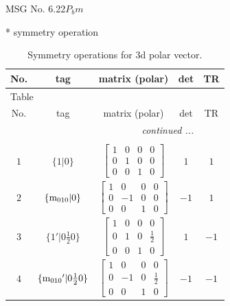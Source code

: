 \documentclass[fleqn,8pt]{jsarticle}
\begin{document}
\setcounter{MaxMatrixCols}{32}

\renewcommand{\tablename}{Table~}
\renewcommand{\figurename}{Figure~}
\begin{center}
\LARGE
MSG No. 6.22\quad$P_{b}m$
\end{center}
* symmetry operation
\renewcommand{\arraystretch}{1.3}
\begin{longtable}{ccccc}
\caption{Symmetry operations for 3d polar vector.}
 \\
 \hline \hline
No. & tag & matrix (polar) & det & TR \\ \hline \endfirsthead

\multicolumn{4}{l}{\tablename\ \thetable{}} \\
 \hline \hline
No. & tag & matrix (polar) & det & TR \\ \hline \endhead

 \hline \hline
\multicolumn{4}{r}{\footnotesize\it continued ...} \\ \endfoot

 \hline \hline
\multicolumn{4}{r}{} \\ \endlastfoot

$ 1 $ & $ \{1|0\} $ & $ \begin{bmatrix} 1 & 0 & 0 & 0 \\ 0 & 1 & 0 & 0 \\ 0 & 0 & 1 & 0 \end{bmatrix} $ & $ 1 $ & $ 1 $ \\ \hline
$ 2 $ & $ \{{\rm m}_{010}|0\} $ & $ \begin{bmatrix} 1 & 0 & 0 & 0 \\ 0 & -1 & 0 & 0 \\ 0 & 0 & 1 & 0 \end{bmatrix} $ & $ -1 $ & $ 1 $ \\ \hline
$ 3 $ & $ \{1{}'|0 \frac{1}{2} 0\} $ & $ \begin{bmatrix} 1 & 0 & 0 & 0 \\ 0 & 1 & 0 & \frac{1}{2} \\ 0 & 0 & 1 & 0 \end{bmatrix} $ & $ 1 $ & $ -1 $ \\ \hline
$ 4 $ & $ \{{\rm m}_{010}{}'|0 \frac{1}{2} 0\} $ & $ \begin{bmatrix} 1 & 0 & 0 & 0 \\ 0 & -1 & 0 & \frac{1}{2} \\ 0 & 0 & 1 & 0 \end{bmatrix} $ & $ -1 $ & $ -1 $ \\
\end{longtable}
\end{document}
